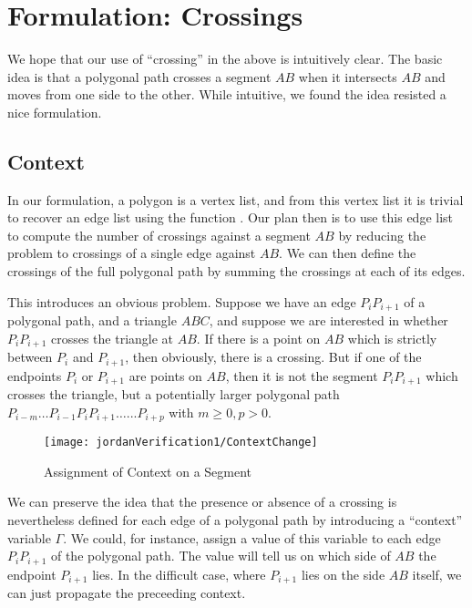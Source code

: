 
\section{Formulation: Crossings}
We hope that our use of ``crossing'' in the above is intuitively clear. The basic idea is that a polygonal path crosses a segment $AB$ when it intersects $AB$ and moves from one side to the other. While intuitive, we found the idea resisted a nice formulation.

\subsection{Context}
In our formulation, a polygon is a vertex list, and from this vertex list it is trivial to recover an edge list using the function . Our plan then is to use this edge list to compute the number of crossings against a segment $AB$ by reducing the problem to crossings of a single edge against $AB$. We can then define the crossings of the full polygonal path by summing the crossings at each of its edges. 

This introduces an obvious problem. Suppose we have an edge $P_iP_{i+1}$ of a polygonal path, and a triangle $ABC$, and suppose we are interested in whether $P_iP_{i+1}$ crosses the triangle at $AB$. If there is a point on $AB$ which is strictly between $P_i$ and $P_{i+1}$, then obviously, there is a crossing. But if one of the endpoints $P_{i}$ or $P_{i+1}$ are points on $AB$, then it is not the segment $P_iP_{i+1}$ which crosses the triangle, but a potentially larger polygonal path $P_{i-m}\ldots P_{i-1}P_iP_{i+1}\ldots...P_{i+p}$ with $m \geq 0, p > 0$. 

\begin{figure}
\centering\texttt{[image: jordanVerification1/ContextChange]}
\caption{Assignment of Context on a Segment}
\label{fig:ContextChanges}
\end{figure}

We can preserve the idea that the presence or absence of a crossing is nevertheless defined for each edge of a polygonal path by introducing a  ``context'' variable $\Gamma$. We could, for instance, assign a value of this variable to each edge $P_iP_{i+1}$ of the polygonal path. The value will tell us on which side of $AB$ the endpoint $P_{i+1}$ lies. In the difficult case, where $P_{i+1}$ lies on the side $AB$ itself, we can just propagate the preceeding context.

